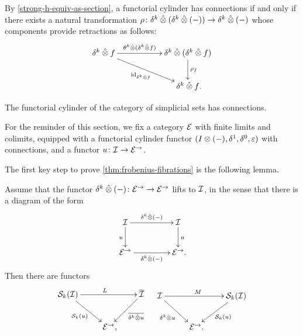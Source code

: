 \documentclass[reqno,10pt,a4paper,oneside,draft]{amsart}
\begin{document}
\begin{remark} \label{thm:retraction-for-connections}
By \cref{strong-h-equiv-as-section}, a functorial cylinder has connections if and only if  there exists a natural transformation $\rho \co \kcyl \hatotimes (\kcyl \hatotimes (-)) \to \kcyl \hatotimes (-)$ whose components provide retractions as follows:
\begin{gather*}
\xymatrix@C+3em{
  \kcyl \hatotimes f
  \ar[r]^-{\thetak \hatotimes (\kcyl \hatotimes f)}
  \ar[dr]_{\id_{\kcyl \hatotimes f}}
&
  \kcyl \hatotimes (\kcyl \hatotimes f)  \ar[d]^{\rho_f}
\\&
  \kcyl \hatotimes f \rlap{.}
}
\end{gather*}
\end{remark}

\begin{example}
The functorial cylinder of the category of simplicial sets has connections.
\end{example}

\begin{example} 
\end{example}

For the reminder of this section, we fix a category $\catE$ with finite limits and colimits, equipped with a functorial cylinder functor $(\interval \otimes (-), \rcyl, \lcyl, \ccyl)$ with connections, and a functor $u \co \cal{I} \to \cal{E}^\to$.

\medskip

The first key step to prove \cref{thm:frobenius-fibrations} is the following lemma.

\begin{lemma} \label{thm:she-to-retract-closure}
Assume that the functor $\kcyl \hatotimes (-) \co \catE^\to \to \catE^\to$ lifts to $\cal{I}$, in the sense that there is a diagram of the form
\[
\xymatrix@C+2em{
  \cal{I}  \ar[d]_u \ar[r]^{\kcyl \hatotimes (-)} & \cal{I} \ar[d]^{u} \\
  \cal{E}^\to \ar[r]_{\kcyl \hatotimes (-)} & \cal{E}^\to \rlap{.} }
\]
Then there are functors
\begin{align*}
\xycenter{
  \cal{S}_k(\cal{I}) \ar[dr]_{\cal{S}_k(u)} \ar[rr]^L & & \overline{\cal{I}} \ar[dl]^-{\overline{\kcyl \hatotimes u}} \\
  & \catE^\to \rlap{,} &
}
&&
\xycenter{
 \cal{I} \ar[dr]_{\kcyl \hatotimes u} \ar[rr]^M & & \cal{S}_k(\cal{I}) \ar[dl]^{\cal{S}_k(u)} \\
 & \ \catE^\to \rlap{.}  &
}
\end{align*}
\end{lemma}
\end{document}
